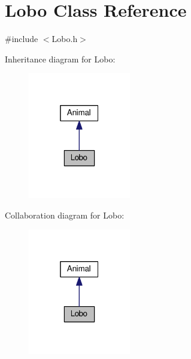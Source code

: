\hypertarget{classLobo}{}\section{Lobo Class Reference}
\label{classLobo}


{\ttfamily \#include $<$Lobo.\+h$>$}



Inheritance diagram for Lobo\+:
\nopagebreak
\begin{figure}[H]
\begin{center}
\leavevmode
\includegraphics[width=127pt]{classLobo__inherit__graph}
\end{center}
\end{figure}


Collaboration diagram for Lobo\+:
\nopagebreak
\begin{figure}[H]
\begin{center}
\leavevmode
\includegraphics[width=127pt]{classLobo__coll__graph}
\end{center}
\end{figure}
